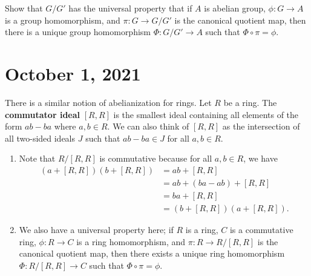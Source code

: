 \begin{exercise}{}
    Show that $G/G'$ has the universal property that if $A$ is abelian 
    group, $\phi : G \to A$ is a group homomorphism, and $\pi 
    : G \to G/G'$ is the canonical quotient map, then there is a 
    unique group homomorphism $\Phi : G/G' \to A$ such that 
    $\Phi \circ \pi = \phi$. 

    \begin{center}
    \end{center}
\end{exercise}

\section{October 1, 2021}
There is a similar notion of abelianization for rings. Let $R$ 
be a ring. The {\bf commutator ideal} $[R, R]$ is the smallest ideal 
containing all elements of the form $ab - ba$ where $a, b \in R$. 
We can also think of $[R, R]$ as the intersection of all two-sided ideals 
$J$ such that $ab - ba \in J$ for all $a, b \in R$. 

\begin{remark}{}
    \begin{enumerate}[(1)]
        \item Note that $R/[R, R]$ is commutative because for all $a, b \in R$, 
        we have 
        \begin{align*}
            (a + [R, R])(b + [R, R]) 
            &= ab + [R, R] \\ 
            &= ab + (ba - ab) + [R, R] \\
            &= ba + [R, R] \\
            &= (b + [R, R])(a + [R, R]).
        \end{align*}
        \item We also have a universal property here; if $R$ is a ring, 
        $C$ is a commutative ring, $\phi : R \to C$ is a ring homomorphism, 
        and $\pi : R \to R/[R, R]$ is the canonical quotient map, then 
        there exists a unique ring homomorphism $\Phi : R/[R, R] \to C$ 
        such that $\Phi \circ \pi = \phi$. 
        \begin{center}
        \end{center}
    \end{enumerate}
\end{remark}

